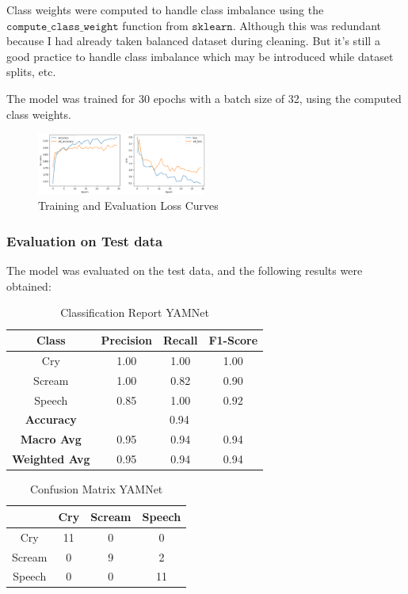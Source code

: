 \documentclass[conference]{IEEEtran}
\begin{document}
Class weights were computed to handle class imbalance using the $\texttt{compute\_class\_weight}$ function from $\texttt{sklearn}$. Although this was redundant because I had already taken balanced dataset during cleaning. But it's still a good practice to handle class imbalance which may be introduced while dataset splits, etc.

The model was trained for 30 epochs with a batch size of 32, using the computed class weights.

\begin{figure}[htbp]
\centerline{\includegraphics[width=0.5\textwidth]{training_eval_loss.png}}
\caption{Training and Evaluation Loss Curves}
\label{fig:loss_curves}
\end{figure}

\subsubsection*{Evaluation on Test data}
The model was evaluated on the test data, and the following results were obtained:

\begin{table}[htbp]
\caption{Classification Report YAMNet}
\begin{center}
\begin{tabular}{|c|c|c|c|}
\hline
\textbf{Class} & \textbf{Precision} & \textbf{Recall} & \textbf{F1-Score} \\
\hline
Cry & 1.00 & 1.00 & 1.00 \\
\hline
Scream & 1.00 & 0.82 & 0.90 \\
\hline
Speech & 0.85 & 1.00 & 0.92 \\
\hline
\textbf{Accuracy} & \multicolumn{3}{|c|}{0.94} \\
\hline
\textbf{Macro Avg} & 0.95 & 0.94 & 0.94 \\
\hline
\textbf{Weighted Avg} & 0.95 & 0.94 & 0.94 \\
\hline
\end{tabular}
\label{tab:classification_report_yamnet}
\end{center}
\end{table}

\begin{table}[htbp]
\caption{Confusion Matrix YAMNet}
\begin{center}
\begin{tabular}{|c|c|c|c|}
\hline
& \textbf{Cry} & \textbf{Scream} & \textbf{Speech} \\
\hline
Cry & 11 & 0 & 0 \\
\hline
Scream & 0 & 9 & 2 \\
\hline
Speech & 0 & 0 & 11 \\
\hline
\end{tabular}
\label{tab:confusion_matrix_yamnet}
\end{center}
\end{table}
\end{document}
